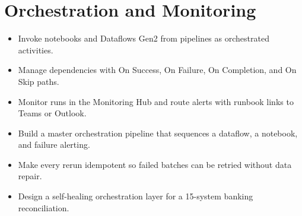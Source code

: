 \chapter{Orchestration and Monitoring}
%

\begin{objectives}
\begin{itemize}
    \item Invoke notebooks and Dataflows Gen2 from pipelines as orchestrated activities.
    \item Manage dependencies with On Success, On Failure, On Completion, and On Skip paths.
    \item Monitor runs in the Monitoring Hub and route alerts with runbook links to Teams or Outlook.
    \item Build a master orchestration pipeline that sequences a dataflow, a notebook, and failure alerting.
    \item Make every rerun idempotent so failed batches can be retried without data repair.
    \item Design a self-healing orchestration layer for a 15-system banking reconciliation.
\end{itemize}
\end{objectives}

